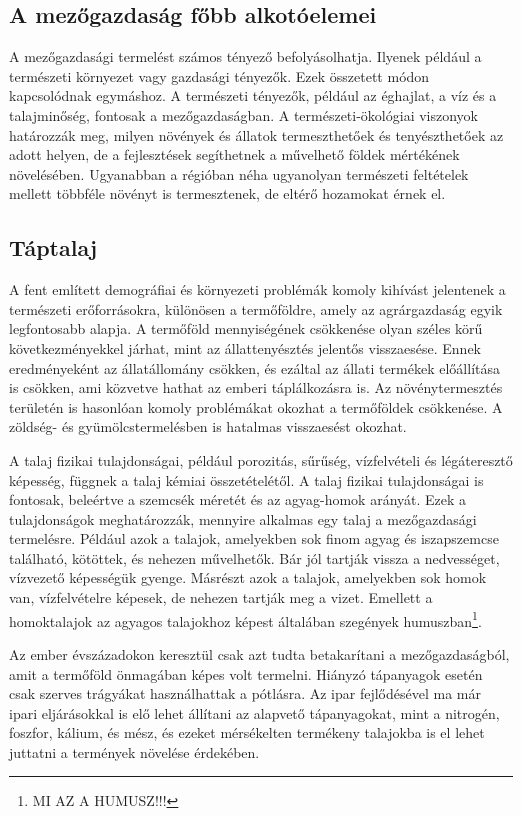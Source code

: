 \documentclass[a4paper,oneside,onecolumn,12pt]{LegrandOrangeBook}
\begin{document}
	\subsection{A mezőgazdaság főbb alkotóelemei}

A mezőgazdasági termelést számos tényező befolyásolhatja. Ilyenek például a természeti környezet vagy gazdasági tényezők. Ezek összetett módon kapcsolódnak egymáshoz. A természeti tényezők, például az éghajlat, a víz és a talajminőség, fontosak a mezőgazdaságban. A természeti-ökológiai viszonyok határozzák meg, milyen növények és állatok termeszthetőek és tenyészthetőek az adott helyen, de a fejlesztések segíthetnek a művelhető földek mértékének növelésében. Ugyanabban a régióban néha ugyanolyan természeti feltételek mellett többféle növényt is termesztenek, de eltérő hozamokat érnek el.

\subsection{Táptalaj}

A fent említett demográfiai és környezeti problémák komoly kihívást jelentenek a természeti erőforrásokra, különösen a termőföldre, amely az agrárgazdaság egyik legfontosabb alapja. A termőföld mennyiségének csökkenése olyan széles körű következményekkel járhat, mint az állattenyésztés jelentős visszaesése. Ennek eredményeként az állatállomány csökken, és ezáltal az állati termékek előállítása is csökken, ami közvetve hathat az emberi táplálkozásra is. Az növénytermesztés területén is hasonlóan komoly problémákat okozhat a termőföldek csökkenése. A zöldség- és gyümölcstermelésben is hatalmas visszaesést okozhat.

A talaj fizikai tulajdonságai, például porozitás, sűrűség, vízfelvételi és légáteresztő képesség, függnek a talaj kémiai összetételétől. A talaj fizikai tulajdonságai is fontosak, beleértve a szemcsék méretét és az agyag-homok arányát. Ezek a tulajdonságok meghatározzák, mennyire alkalmas egy talaj a mezőgazdasági termelésre. Például azok a talajok, amelyekben sok finom agyag és iszapszemcse található, kötöttek, és nehezen művelhetők. Bár jól tartják vissza a nedvességet, vízvezető képességük gyenge. Másrészt azok a talajok, amelyekben sok homok van,  vízfelvételre képesek, de nehezen tartják meg a vizet. Emellett a homoktalajok az agyagos talajokhoz képest általában szegények humuszban\footnote{MI AZ A HUMUSZ!!!}.

Az ember évszázadokon keresztül csak azt tudta betakarítani a mezőgazdaságból, amit a termőföld önmagában képes volt termelni. Hiányzó tápanyagok esetén csak szerves trágyákat használhattak a pótlásra. Az ipar fejlődésével ma már ipari eljárásokkal is elő lehet állítani az alapvető tápanyagokat, mint a nitrogén, foszfor, kálium, és mész, és ezeket mérsékelten termékeny talajokba is el lehet juttatni a termények növelése érdekében.
\end{document}
